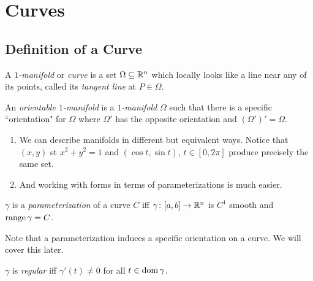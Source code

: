 \documentclass[notes]{subfiles}
\begin{document}
\setcounter{section}{2}
\section{Curves}

\subsection{Definition of a Curve}
\begin{definition}[$1$-Manifold]
    A \textit{$1$-manifold} or \textit{curve} is a set $\Omega \subseteq \mathbb{R}^n$ which locally looks like a line near any of its points, called its \textit{tangent line} at $P \in \Omega$.
\end{definition}
\begin{definition}
    An \textit{orientable $1$-manifold} is a \textit{$1$-manifold} $\Omega$ such that there is a specific ``orientation" for $\Omega$ where $\Omega'$ has the opposite orientation and $(\Omega')' = \Omega$.
\end{definition}
\begin{enumerate}[label = \arabic*)]
    \item We can describe manifolds in different but equivalent ways. Notice that $(x, y)$ st $x^2 + y^2 = 1$ and $(\cos t, \sin t)$, $t \in [0, 2\pi]$ produce precisely the same set.
    \item And working with forms in terms of parameterizations is much easier.
\end{enumerate}

\begin{definition}
    $\gamma$ is a \textit{parameterization} of a curve $C$ iff $\gamma\colon [a, b] \to \mathbb{R}^n$ is $C^1$ smooth and $\operatorname{range} \gamma = C$.
\end{definition}
Note that a parameterization induces a specific orientation on a curve. We will cover this later.

\begin{definition}[Regularity]
    $\gamma$ is \textit{regular} iff $\gamma'(t) \neq 0$ for all $t \in \operatorname{dom} \gamma$.
\end{definition}
\end{document}
